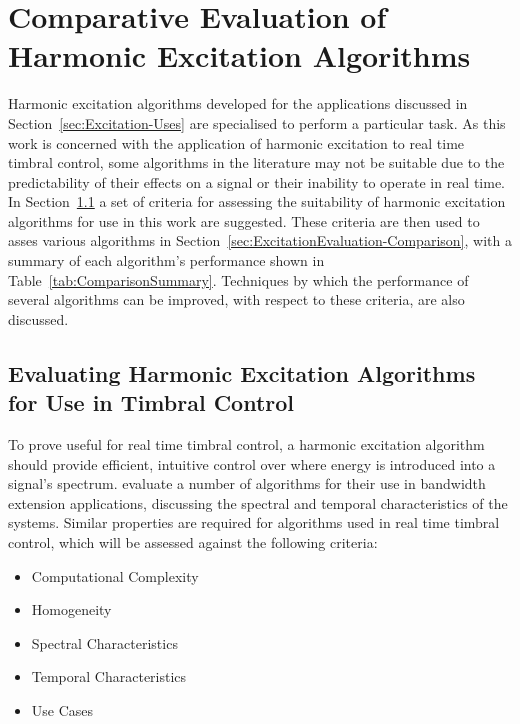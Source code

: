 
\chapter{Comparative Evaluation of Harmonic Excitation Algorithms}
\label{chap:ExcitationEvaluation}
	Harmonic excitation algorithms developed for the applications discussed in Section~\ref{sec:Excitation-Uses} are
	specialised to perform a particular task. As this work is concerned with the application of harmonic excitation to
	real time timbral control, some algorithms in the literature may not be suitable due to the predictability of their
	effects on a signal or their inability to operate in real time. In
	Section~\ref{sec:ExcitationEvaluation-Evaluation} a set of criteria for assessing the suitability of harmonic
	excitation algorithms for use in this work are suggested. These criteria are then used to asses various algorithms
	in Section~\ref{sec:ExcitationEvaluation-Comparison}, with a summary of each algorithm's performance shown in
	Table~\ref{tab:ComparisonSummary}. Techniques by which the performance of several algorithms can be improved, with
	respect to these criteria, are also discussed.

\section{Evaluating Harmonic Excitation Algorithms for Use in Timbral Control}
\label{sec:ExcitationEvaluation-Evaluation}
	To prove useful for real time timbral control, a harmonic excitation algorithm should provide efficient, intuitive
	control over where energy is introduced into a signal's spectrum. \citet{larsen2004audio} evaluate a number of
	algorithms for their use in bandwidth extension applications, discussing the spectral and temporal characteristics
	of the systems. Similar properties are required for algorithms used in real time timbral control, which will be
	assessed against the following criteria:

	\begin{itemize}
		\item Computational Complexity
		\item Homogeneity
		\item Spectral Characteristics
		\item Temporal Characteristics
		\item Use Cases
	\end{itemize}

